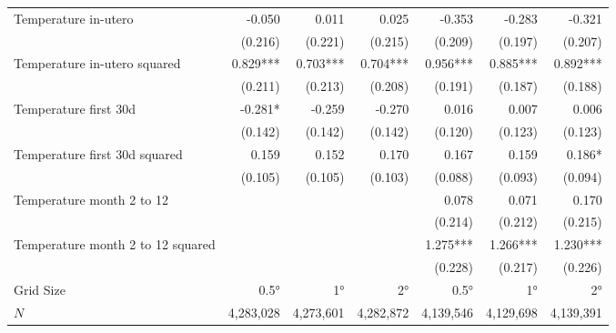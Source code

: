 \begin{tabular}{lrrrrrr}
Temperature in-utero                        &      -0.050 &       0.011 &        0.025 &       -0.353 &       -0.283 &       -0.321 \\ 
                                            &     (0.216) &     (0.221) &      (0.215) &      (0.209) &      (0.197) &      (0.207) \\ 
Temperature in-utero  squared               &    0.829*** &    0.703*** &     0.704*** &     0.956*** &     0.885*** &     0.892*** \\ 
                                            &     (0.211) &     (0.213) &      (0.208) &      (0.191) &      (0.187) &      (0.188) \\ 
Temperature first 30d                       &     -0.281* &      -0.259 &       -0.270 &        0.016 &        0.007 &        0.006 \\ 
                                            &     (0.142) &     (0.142) &      (0.142) &      (0.120) &      (0.123) &      (0.123) \\ 
Temperature first 30d squared               &       0.159 &       0.152 &        0.170 &        0.167 &        0.159 &       0.186* \\ 
                                            &     (0.105) &     (0.105) &      (0.103) &      (0.088) &      (0.093) &      (0.094) \\ 
Temperature month 2 to 12                   &             &             &              &        0.078 &        0.071 &        0.170 \\ 
                                            &             &             &              &      (0.214) &      (0.212) &      (0.215) \\ 
Temperature month 2 to 12 squared           &             &             &              &     1.275*** &     1.266*** &     1.230*** \\ 
                                            &             &             &              &      (0.228) &      (0.217) &      (0.226) \\ 
\midrule
Grid Size                                   &       0.5°  &      1°     &      2°      &      0.5°    &     1°       &          2°  \\
$N$                                         &   4,283,028 &   4,273,601 &    4,282,872 &    4,139,546 &    4,129,698 &    4,139,391 \\ 
\bottomrule
\end{tabular}
